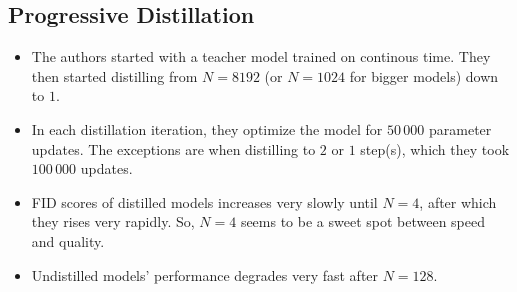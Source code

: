 \documentclass[10pt]{article}
\begin{document}
\subsection{Progressive Distillation}

\begin{itemize}
  \item The authors started with a teacher model trained on continous time. They then started distilling from $N = 8192$ (or $N = 1024$ for bigger models) down to $1$.
  
  \item In each distillation iteration, they optimize the model for $50\,000$ parameter updates. The exceptions are when distilling to $2$ or $1$ step(s), which they took $100\,000$ updates.
  
  \item FID scores of distilled models increases very slowly until $N = 4$, after which they rises very rapidly. So, $N = 4$ seems to be a sweet spot between speed and quality.
  
  \item Undistilled models' performance degrades very fast after $N = 128$.
\end{itemize}


  
\end{document}
